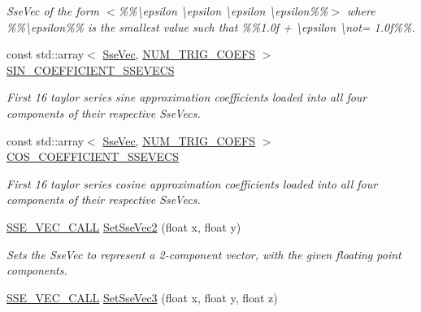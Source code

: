 \begin{DoxyCompactItemize}
\begin{DoxyCompactList}\small\item\em Sse\+Vec of the form $<$\%\%\textbackslash{}epsilon \textbackslash{}epsilon \textbackslash{}epsilon \textbackslash{}epsilon\%\%$>$ where \%\%\textbackslash{}epsilon\%\% is the smallest value such that \%\%1.\+0f + \textbackslash{}epsilon \textbackslash{}not= 1.\+0f\%\%. \end{DoxyCompactList}\item 
const std\+::array$<$ \hyperlink{namespacegfxmath_a0de2243e2b8d0fd46d3af5e036423004}{Sse\+Vec}, \hyperlink{group___scalar_math_consts_ga090f5a34fbed01148a6f72dc1abb00e9}{N\+U\+M\+\_\+\+T\+R\+I\+G\+\_\+\+C\+O\+E\+F\+S} $>$ \hyperlink{namespacegfxmath_a3438c32cb667015ef36e073223840f2a}{S\+I\+N\+\_\+\+C\+O\+E\+F\+F\+I\+C\+I\+E\+N\+T\+\_\+\+S\+S\+E\+V\+E\+C\+S}
\begin{DoxyCompactList}\small\item\em First 16 taylor series sine approximation coefficients loaded into all four components of their respective Sse\+Vecs. \end{DoxyCompactList}\item 
const std\+::array$<$ \hyperlink{namespacegfxmath_a0de2243e2b8d0fd46d3af5e036423004}{Sse\+Vec}, \hyperlink{group___scalar_math_consts_ga090f5a34fbed01148a6f72dc1abb00e9}{N\+U\+M\+\_\+\+T\+R\+I\+G\+\_\+\+C\+O\+E\+F\+S} $>$ \hyperlink{namespacegfxmath_a499cf8b9541a276eff2bf16760eb3004}{C\+O\+S\+\_\+\+C\+O\+E\+F\+F\+I\+C\+I\+E\+N\+T\+\_\+\+S\+S\+E\+V\+E\+C\+S}
\begin{DoxyCompactList}\small\item\em First 16 taylor series cosine approximation coefficients loaded into all four components of their respective Sse\+Vecs. \end{DoxyCompactList}\item 
\hyperlink{ssevec__math__defs_8h_a97454f977a5281455cecacce1e8ba670}{S\+S\+E\+\_\+\+V\+E\+C\+\_\+\+C\+A\+L\+L} \hyperlink{namespacegfxmath_a9b39fe150660cfec6f39ea5c91e073b5}{Set\+Sse\+Vec2} (float x, float y)
\begin{DoxyCompactList}\small\item\em Sets the Sse\+Vec to represent a 2-\/component vector, with the given floating point components. \end{DoxyCompactList}\item 
\hyperlink{ssevec__math__defs_8h_a97454f977a5281455cecacce1e8ba670}{S\+S\+E\+\_\+\+V\+E\+C\+\_\+\+C\+A\+L\+L} \hyperlink{namespacegfxmath_a81678277edfb7788c4350f27c871f429}{Set\+Sse\+Vec3} (float x, float y, float z)

\end{DoxyCompactItemize}
